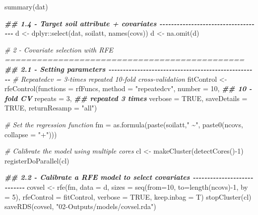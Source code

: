 \documentclass[
  10pt,
  b5paper,
  oneside]{book}
\newenvironment{Shaded}{\begin{snugshade}}{\end{snugshade}}
\newcommand{\AttributeTok}[1]{\textcolor[rgb]{0.77,0.63,0.00}{#1}}
\newcommand{\CommentTok}[1]{\textcolor[rgb]{0.56,0.35,0.01}{\textit{#1}}}
\newcommand{\ConstantTok}[1]{\textcolor[rgb]{0.00,0.00,0.00}{#1}}
\newcommand{\DecValTok}[1]{\textcolor[rgb]{0.00,0.00,0.81}{#1}}
\newcommand{\DocumentationTok}[1]{\textcolor[rgb]{0.56,0.35,0.01}{\textbf{\textit{#1}}}}
\newcommand{\FunctionTok}[1]{\textcolor[rgb]{0.00,0.00,0.00}{#1}}
\newcommand{\NormalTok}[1]{#1}
\newcommand{\OtherTok}[1]{\textcolor[rgb]{0.56,0.35,0.01}{#1}}
\newcommand{\SpecialCharTok}[1]{\textcolor[rgb]{0.00,0.00,0.00}{#1}}
\newcommand{\StringTok}[1]{\textcolor[rgb]{0.31,0.60,0.02}{#1}}
\begin{document}
\begin{Shaded}
\begin{Highlighting}[]
\FunctionTok{summary}\NormalTok{(dat)}

\DocumentationTok{\#\# 1.4 {-} Target soil attribute + covariates {-}{-}{-}{-}{-}{-}{-}{-}{-}{-}{-}{-}{-}{-}{-}{-}{-}{-}{-}{-}{-}{-}{-}{-}{-}{-}{-}{-}{-}{-}{-}{-}{-}{-}{-}{-}}
\NormalTok{d }\OtherTok{\textless{}{-}}\NormalTok{ dplyr}\SpecialCharTok{::}\FunctionTok{select}\NormalTok{(dat, soilatt, }\FunctionTok{names}\NormalTok{(covs))}
\NormalTok{d }\OtherTok{\textless{}{-}} \FunctionTok{na.omit}\NormalTok{(d)}

\CommentTok{\# 2 {-} Covariate selection with RFE =============================================}
\DocumentationTok{\#\# 2.1 {-} Setting parameters {-}{-}{-}{-}{-}{-}{-}{-}{-}{-}{-}{-}{-}{-}{-}{-}{-}{-}{-}{-}{-}{-}{-}{-}{-}{-}{-}{-}{-}{-}{-}{-}{-}{-}{-}{-}{-}{-}{-}{-}{-}{-}{-}{-}{-}{-}{-}{-}{-}{-}{-}{-}}
\CommentTok{\# Repeatedcv = 3{-}times repeated 10{-}fold cross{-}validation}
\NormalTok{fitControl }\OtherTok{\textless{}{-}} \FunctionTok{rfeControl}\NormalTok{(}\AttributeTok{functions =}\NormalTok{ rfFuncs,}
                         \AttributeTok{method =} \StringTok{"repeatedcv"}\NormalTok{,}
                         \AttributeTok{number =} \DecValTok{10}\NormalTok{,         }\DocumentationTok{\#\# 10 {-}fold CV}
                         \AttributeTok{repeats =} \DecValTok{3}\NormalTok{,        }\DocumentationTok{\#\# repeated 3 times}
                         \AttributeTok{verbose =} \ConstantTok{TRUE}\NormalTok{,}
                         \AttributeTok{saveDetails =} \ConstantTok{TRUE}\NormalTok{, }
                         \AttributeTok{returnResamp =} \StringTok{"all"}\NormalTok{)}

\CommentTok{\# Set the regression function}
\NormalTok{fm }\OtherTok{=} \FunctionTok{as.formula}\NormalTok{(}\FunctionTok{paste}\NormalTok{(soilatt,}\StringTok{" \textasciitilde{}"}\NormalTok{, }\FunctionTok{paste0}\NormalTok{(ncovs,}
                                             \AttributeTok{collapse =} \StringTok{"+"}\NormalTok{)))}

\CommentTok{\# Calibrate the model using multiple cores}
\NormalTok{cl }\OtherTok{\textless{}{-}} \FunctionTok{makeCluster}\NormalTok{(}\FunctionTok{detectCores}\NormalTok{()}\SpecialCharTok{{-}}\DecValTok{1}\NormalTok{)}
\FunctionTok{registerDoParallel}\NormalTok{(cl)}


\DocumentationTok{\#\# 2.2 {-} Calibrate a RFE model to select covariates {-}{-}{-}{-}{-}{-}{-}{-}{-}{-}{-}{-}{-}{-}{-}{-}{-}{-}{-}{-}{-}{-}{-}{-}{-}{-}{-}{-}}
\NormalTok{covsel }\OtherTok{\textless{}{-}} \FunctionTok{rfe}\NormalTok{(fm,}
              \AttributeTok{data =}\NormalTok{ d,  }
              \AttributeTok{sizes =} \FunctionTok{seq}\NormalTok{(}\AttributeTok{from=}\DecValTok{10}\NormalTok{, }\AttributeTok{to=}\FunctionTok{length}\NormalTok{(ncovs)}\SpecialCharTok{{-}}\DecValTok{1}\NormalTok{, }\AttributeTok{by =} \DecValTok{5}\NormalTok{),}
              \AttributeTok{rfeControl =}\NormalTok{ fitControl,}
              \AttributeTok{verbose =} \ConstantTok{TRUE}\NormalTok{,}
              \AttributeTok{keep.inbag =}\NormalTok{ T)}
\FunctionTok{stopCluster}\NormalTok{(cl)}
\FunctionTok{saveRDS}\NormalTok{(covsel, }\StringTok{"02{-}Outputs/models/covsel.rda"}\NormalTok{)}


\end{Highlighting}
\end{Shaded}
\end{document}

